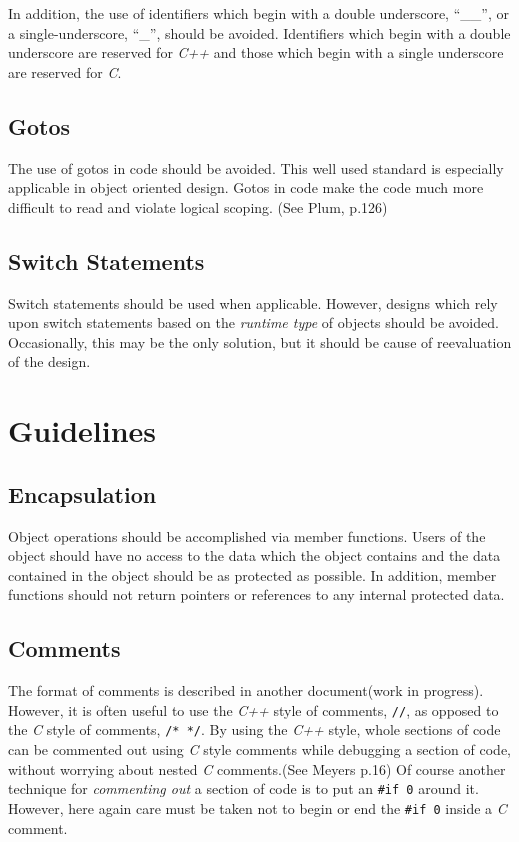 In addition, the use of identifiers which begin with a double underscore,
``\_\_'', or a single-underscore, ``\_'', should be avoided. Identifiers 
which begin with a double underscore are reserved for \emph{C++} and 
those which begin with a single underscore are reserved for \emph{C}.

\subsection{Gotos}
The use of gotos in code should be avoided. This well used standard is 
especially applicable in object oriented design. Gotos in code make the
code much more difficult to read and violate logical scoping.
(See Plum, p.126)

\subsection{Switch Statements}
Switch statements should be used when applicable. However, designs which
rely upon switch statements based on the \emph{runtime type} of objects
should be avoided. Occasionally, this may be the only solution, but
it should be cause of reevaluation of the design.

\section{Guidelines}
\subsection{Encapsulation}
Object operations should be accomplished via member functions. Users of the
object should have no access to the data which the object contains and the
data contained in the object should be as protected as possible. In addition,
member functions should not return pointers or references to any internal
protected data.

\subsection{Comments}
The format of comments is described in another document(work in progress). However,
it is often useful to use the \emph{C++} style of comments, \texttt{//}, as
opposed to the \emph{C} style of comments, \texttt{/* */}. By using
the \emph{C++} style, whole sections of code can be commented out using
\emph{C} style comments while debugging a section of code, without worrying
about nested \emph{C} comments.(See Meyers p.16) Of course another
technique for \emph{commenting out} a section of code is to put an
\texttt{\#if 0} around it. However, here again care must be taken not to 
begin or end the \texttt{\#if 0} inside a \emph{C} comment.

